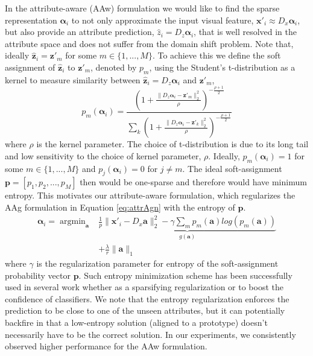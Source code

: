 \documentclass[letterpaper]{article} %
\def\x{\mathbf{x}}
\def\a{\mathbf{a}}
\def\p{\mathbf{p}}
\def\z{\mathbf{z}}
\def\balpha{\boldsymbol{\alpha}}
\begin{document}
In the attribute-aware (AAw) formulation we would like to find the sparse representation $\balpha_i$ to not only approximate the input visual feature, $\x'_i\approx D_x\balpha_i$, but also provide an attribute prediction, $\hat{z}_i=D_z\balpha_i$, that is well resolved in the attribute space and does not suffer from the domain shift problem. Note that, ideally $\hat{\z}_i=\z'_m$ for some $m\in\{1,...,M\}$. To achieve this we define the soft assignment of $\hat{\z}_i$ to $\z'_m$, denoted by $p_m$, using the Student's t-distribution as a kernel to measure similarity between $\hat{\z}_i=D_z\balpha_i$ and $\z'_m$,
\begin{equation}
p_m(\balpha_i)=\frac{(1+\frac{\|D_z\balpha_i-\z'_m\|^2_2}{\rho})^{-\frac{\rho+1}{2}}}{\sum_k (1+\frac{\|D_z\balpha_i-\z'_k\|^2_2}{\rho})^{-\frac{\rho+1}{2}}}
\label{eq:softass} 
\end{equation}
where $\rho$ is the kernel parameter. The choice of t-distribution is due to its long tail and low sensitivity to the choice of kernel parameter, $\rho$.  Ideally, $p_m(\balpha_i)=1$ for some $m\in\{1,...,M\}$ and $p_j(\balpha_i)=0$ for $j\neq m$. The ideal soft-assignment $\p=[p_1,p_2,...,p_M]$ then would be one-sparse and therefore would have minimum entropy. This motivates our attribute-aware formulation, which regularizes the AAg formulation in Equation \ref{eq:attrAgn} with the entropy of $\p$.
\begin{equation}
\begin{split}
\balpha_i=\operatorname{argmin}_\a&\underbrace{\frac{1}{p}\|\x'_i-D_x\a\|_2^2 -\gamma \sum_m p_m(\a)log(p_m(\a))}_{g(\a)} \\&+\frac{\lambda}{r}\|\a\|_1\end{split}
\label{eq:attrAware}
\end{equation}
where $\gamma$ is the regularization parameter for entropy of the soft-assignment probability vector $\p$. Such entropy minimization scheme has been successfully used in several work \cite{grandvalet2004semi,huang2016sparse} whether as a sparsifying regularization or to boost the confidence of classifiers. We note that the entropy regularization enforces the prediction to be close to one of the unseen attributes, but it can potentially backfire in that a low-entropy solution (aligned to a prototype) doesn't necessarily have to be the correct solution. In our experiments, we consistently observed higher performance for the AAw formulation. 
\end{document}
